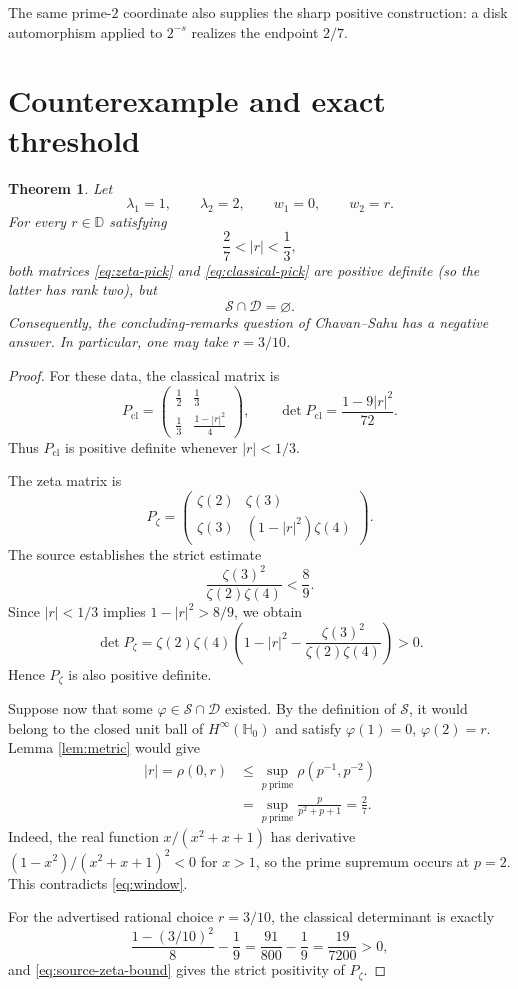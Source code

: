 \documentclass[11pt]{article}
\newtheorem{theorem}{Theorem}
\newcommand{\D}{\mathbb D}
\newcommand{\Hh}{\mathbb H}
\newcommand{\cD}{\mathcal D}
\newcommand{\zetaP}{P_{\zeta}}
\newcommand{\classP}{P_{\mathrm{cl}}}
\begin{document}
The same prime-$2$ coordinate also supplies the sharp positive construction:
a disk automorphism applied to $2^{-s}$ realizes the endpoint $2/7$.

\section{Counterexample and exact threshold}

\begin{theorem}
\label{thm:counterexample}
Let
\[
 \lambda_1=1,\qquad \lambda_2=2,\qquad w_1=0,\qquad w_2=r.
\]
For every $r\in\D$ satisfying
\begin{equation}
 \frac27<|r|<\frac13,
 \label{eq:window}
\end{equation}
both matrices \eqref{eq:zeta-pick} and \eqref{eq:classical-pick} are positive
definite (so the latter has rank two), but
\[
 \mathcal S\cap\cD=\varnothing.
\]
Consequently, the concluding-remarks question of Chavan--Sahu has a negative
answer.  In particular, one may take $r=3/10$.
\end{theorem}

\begin{proof}
For these data, the classical matrix is
\[
 \classP=
 \begin{pmatrix}
  \frac12&\frac13\\[2pt]
  \frac13&\frac{1-|r|^2}{4}
 \end{pmatrix},
 \qquad
 \det\classP=\frac{1-9|r|^2}{72}.
\]
Thus $\classP$ is positive definite whenever $|r|<1/3$.

The zeta matrix is
\[
 \zetaP=
 \begin{pmatrix}
  \zeta(2)&\zeta(3)\\
  \zeta(3)&(1-|r|^2)\zeta(4)
 \end{pmatrix}.
\]
The source establishes the strict estimate
\begin{equation}
 \frac{\zeta(3)^2}{\zeta(2)\zeta(4)}<\frac89.
 \label{eq:source-zeta-bound}
\end{equation}
Since $|r|<1/3$ implies $1-|r|^2>8/9$, we obtain
\[
 \det\zetaP
 =\zeta(2)\zeta(4)\left(
 1-|r|^2-\frac{\zeta(3)^2}{\zeta(2)\zeta(4)}\right)>0.
\]
Hence $\zetaP$ is also positive definite.

Suppose now that some $\varphi\in\mathcal S\cap\cD$ existed.  By the
definition of $\mathcal S$, it would belong to the closed unit ball of
$H^\infty(\Hh_0)$ and satisfy $\varphi(1)=0$, $\varphi(2)=r$.  Lemma
\ref{lem:metric} would give
\begin{align*}
 |r|=\rho(0,r)
 &\leq \sup_{p\ \mathrm{prime}}\rho(p^{-1},p^{-2})\\
 &=\sup_{p\ \mathrm{prime}}\frac{p}{p^2+p+1}=\frac27.
\end{align*}
Indeed, the real function $x/(x^2+x+1)$ has derivative
$(1-x^2)/(x^2+x+1)^2<0$ for $x>1$, so the prime supremum occurs at $p=2$.
This contradicts \eqref{eq:window}.

For the advertised rational choice $r=3/10$, the classical determinant is
exactly
\[
 \frac{1-(3/10)^2}{8}-\frac19
 =\frac{91}{800}-\frac19=\frac{19}{7200}>0,
\]
and \eqref{eq:source-zeta-bound} gives the strict positivity of $\zetaP$.
\end{proof}
\end{document}
